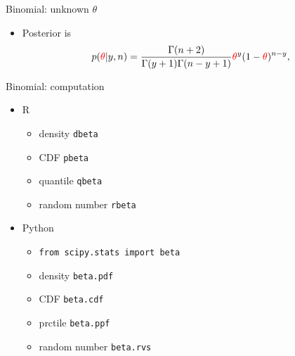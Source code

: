 \documentclass[english,t]{beamer}
\begin{document}

\begin{frame}{Binomial: unknown $\theta$}

  \begin{itemize}
  \item {\color{blue}Posterior} is
    \begin{align*}
      p({\color{red}\theta}|y,n) = \frac{\Gamma(n+2)}{\Gamma(y+1)\Gamma(n-y+1)}{\color{red}\theta}^y(1-{\color{red}\theta})^{n-y},
    \end{align*}
  \end{itemize}
  \begin{center}
  \end{center}
\end{frame}

\begin{frame}{Binomial: computation}

  \begin{itemize}
  \item R
    \begin{itemize}
    \item density {\tt dbeta}
    \item CDF {\tt pbeta}
    \item quantile {\tt qbeta}
    \item random number {\tt rbeta}
    \end{itemize}
  \item Python
    \begin{itemize}
    \item {\tt from scipy.stats import beta}
    \item density {\tt beta.pdf}
    \item CDF {\tt beta.cdf}
    \item prctile {\tt beta.ppf}
    \item random number {\tt beta.rvs}
    \end{itemize}
  \end{itemize}

\end{frame}
\end{document}

